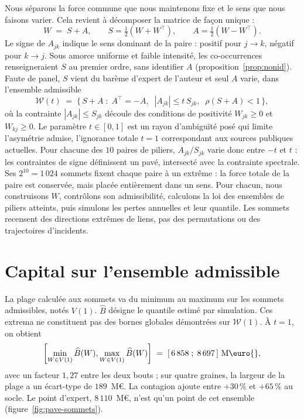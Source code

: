 Nous séparons la force commune que nous maintenons fixe et le sens que nous faisons varier.
Cela revient à décomposer la matrice de façon unique :
\[
  W \;=\; S + A, \qquad S = \tfrac{1}{2}(W + W^{\top}), \qquad A = \tfrac{1}{2}(W - W^{\top}) .
\]
Le signe de $A_{jk}$ indique le sens dominant de la paire : positif pour $j\to k$, négatif pour
$k\to j$. Sous amorce uniforme et faible intensité, les co-occurrences renseigneraient $S$ au
premier ordre, sans identifier $A$ (proposition~\ref{prop:nonid}). Faute de panel, $S$ vient du
barème d'expert de l'auteur et seul $A$ varie, dans l'ensemble admissible
\[
  \mathcal{W}(t) \;=\; \bigl\{\, S + A \;:\; A^{\top} = -A, \;\; |A_{jk}| \leq t\,S_{jk},
  \;\; \rho(S+A) < 1 \,\bigr\},
\]
où la contrainte $|A_{jk}| \leq S_{jk}$ découle des conditions de positivité $W_{jk}\geq 0$ et
$W_{kj}\geq 0$. Le paramètre $t\in[0,1]$ est un rayon d'ambiguïté posé qui limite l'asymétrie admise, l'ignorance
totale $t=1$ correspondant aux sources publiques actuelles. Pour chacune des $10$ paires de piliers,
$A_{jk}/S_{jk}$ varie donc entre $-t$ et $t$ : les contraintes de signe définissent un pavé,
intersecté avec la contrainte spectrale. Ses $2^{10} = 1\,024$ sommets fixent chaque paire à un
extrême : la force totale de la paire est conservée, mais placée entièrement dans un sens.
Pour chacun, nous construisons $W$, contrôlons son admissibilité, calculons la loi des
ensembles de piliers atteints, puis simulons les pertes annuelles et leur quantile. Les sommets
recensent des directions extrêmes de liens, pas des permutations ou des trajectoires d'incidents.


\section{Capital sur l'ensemble admissible}

La plage calculée aux sommets va du minimum au maximum sur les sommets admissibles, notés $V(1)$.
$\widehat B$ désigne le quantile estimé par simulation. Ces extrema ne constituent pas des bornes globales démontrées sur $\mathcal W(1)$. À $t=1$, on obtient
\[
  \left[\min_{W\in V(1)}\widehat{B}(W),\max_{W\in V(1)}\widehat{B}(W)\right] \;=\; [\,6\,858 \;;\; 8\,697\,]~\text{M\euro{}} ,
\]
avec un facteur $1{,}27$ entre les deux bouts ; sur quatre graines, la largeur de la plage a un écart-type de
$189$~M\euro{}. La contagion ajoute entre $+30\,\%$ et
$+65\,\%$ au socle. Le point d'expert, $8\,110$~M\euro{}, n'est qu'un point de cet ensemble
(figure~\ref{fig:pave-sommets}).

